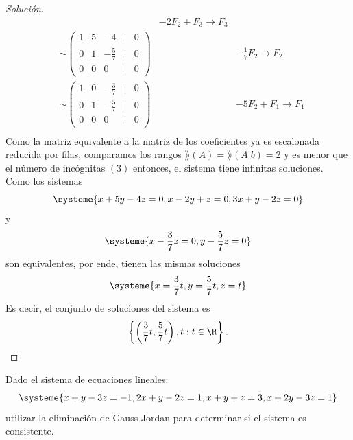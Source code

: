 \documentclass[a4,11pt]{aleph-notas}
\begin{document}
\begin{proof}[Solución]
\begin{align*}
      && -2F_2+F_3\to F_3\\
      & \sim 
      \begin{pmatrix}
        1&5&-4&|&0\\
        0&1&-\frac{5}{7}&|&0\\
        0&0&0&|&0
      \end{pmatrix}
      && -\frac{1}{7}F_2\to F_2\\
      & \sim 
      \begin{pmatrix}
        1&0&-\frac{3}{7}&|&0\\
        0&1&-\frac{5}{7}&|&0\\
        0&0&0&|&0
      \end{pmatrix}
      && -5F_2+F_1\to F_1\\
      \end{align*}
      Como la matriz equivalente a la matriz de los coeficientes ya es escalonada reducida por filas, comparamos los rangos $\rang (A) = \rang (A|b) = 2$ y es menor que el número de incógnitas $(3)$ entonces, el sistema tiene infinitas soluciones. Como los sistemas
      \[
      \systeme{x+5y-4z=0, x-2y+z=0, 3x+y-2z=0}
      \]
      y
      \[
      \systeme{x-\frac{3}{7}z=0, y-\frac{5}{7}z=0}
      \]
      son equivalentes, por ende, tienen las mismas soluciones
      \[
      \systeme{x=\frac{3}{7}t, y=\frac{5}{7}t, z=t}
      \]
      Es decir, el conjunto de soluciones del sistema es
      \[
      \left\{ \left( \frac{3}{7}t,\frac{5}{7}t\right),t:t \in \R \right\}.\qedhere
      \]
\end{proof}


\begin{ejer}
    Dado el sistema de ecuaciones lineales:
    \[
        \systeme{x+y-3z=-1, 2x+y-2z=1, x+y+z=3, x+2y-3z=1}
    \]
    utilizar la eliminación de Gauss-Jordan para determinar si el sistema es consistente.
\end{ejer}
\end{document}

